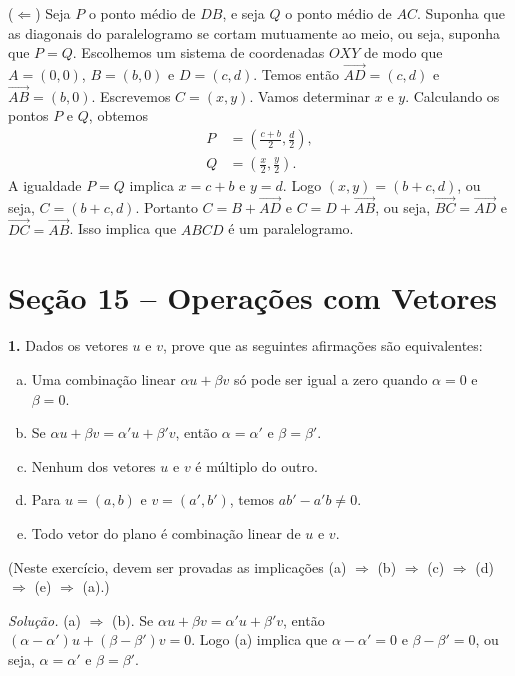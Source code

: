 \documentclass[a4paper,11pt]{article}
\begin{document}
($\Leftarrow$)
Seja $P$ o ponto médio de $DB$, e seja $Q$ o ponto médio de $AC$.
Suponha que as diagonais do paralelogramo se cortam mutuamente ao meio, ou seja, suponha que $P = Q$.
Escolhemos um sistema de coordenadas $OXY$ de modo que $A = (0,0)$, $B = (b,0)$ e $D = (c, d)$.
Temos então $\overrightarrow{AD} = (c,d)$ e $\overrightarrow{AB} = (b,0)$.
Escrevemos $C = (x,y)$.
Vamos determinar $x$ e $y$.
Calculando os pontos $P$ e $Q$, obtemos
\begin{align*}
  P & = \left( \frac{c+b}{2}, \frac{d}{2} \right), \\
  Q & = \left( \frac{x}{2}, \frac{y}{2} \right).
\end{align*}
A igualdade $P = Q$ implica $x = c + b$ e $y = d$.
Logo $(x,y) = (b + c, d)$, ou seja, $C = (b + c, d)$.
Portanto $C = B + \overrightarrow{AD}$ e $C = D + \overrightarrow{AB}$, ou seja, $\overrightarrow{BC} = \overrightarrow{AD}$ e $\overrightarrow{DC} = \overrightarrow{AB}$.
Isso implica que $ABCD$ é um paralelogramo.

\section*{Seção 15 -- Operações com Vetores}

\textbf{1.}
Dados os vetores $u$ e $v$, prove que as seguintes afirmações são equivalentes:
\begin{enumerate}[(a)]
  \item
    Uma combinação linear $\alpha u + \beta v$ só pode ser igual a zero quando $\alpha = 0$ e $\beta = 0$.
  \item
    Se $\alpha u + \beta v = \alpha' u + \beta' v$, então $\alpha = \alpha'$ e $\beta = \beta'$.
  \item
    Nenhum dos vetores $u$ e $v$ é múltiplo do outro.
  \item
    Para $u = (a, b)$ e $v = (a', b')$, temos $a b' - a' b \neq 0$.
  \item
    Todo vetor do plano é combinação linear de $u$ e $v$.
\end{enumerate}
(Neste exercício, devem ser provadas as implicações (a) $\Rightarrow$ (b) $\Rightarrow$ (c) $\Rightarrow$ (d) $\Rightarrow$ (e) $\Rightarrow$ (a).)

\vspace{\baselineskip}

\emph{Solução.}
(a) $\Rightarrow$ (b).
Se $\alpha u + \beta v = \alpha' u + \beta' v$, então $(\alpha - \alpha')u + (\beta - \beta') v = 0$.
Logo (a) implica que $\alpha - \alpha' = 0$ e $\beta - \beta' = 0$, ou seja, $\alpha = \alpha'$ e $\beta = \beta'$.
\end{document}
